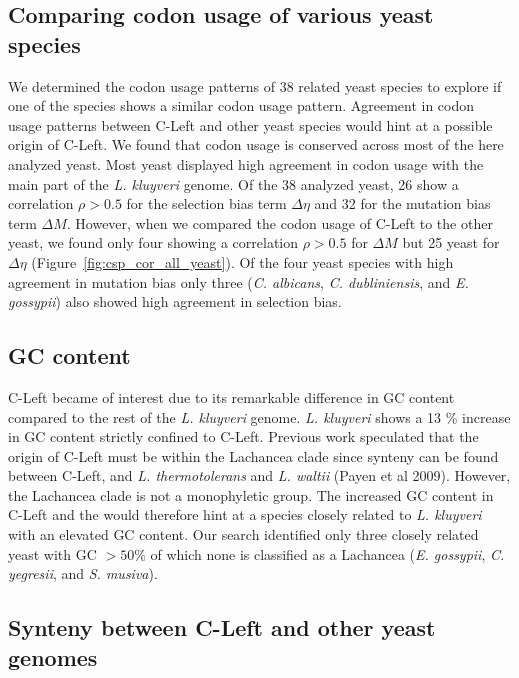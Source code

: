 \documentclass[12pt]{article}
\begin{document}
\subsection*{Comparing codon usage of various yeast species}
We determined the codon usage patterns of 38 related yeast species to explore if one of the species shows a similar codon usage pattern.
Agreement in codon usage patterns between C-Left and other yeast species would hint at a possible origin of C-Left.
We found that codon usage is conserved across most of the here analyzed yeast. 
Most yeast displayed high agreement in codon usage with the main part of the \textit{L. kluyveri} genome. Of the 38 analyzed yeast, 26 show a correlation $\rho > 0.5$ for the selection bias term $\Delta \eta$ and 32 for the mutation bias term $\Delta M$.
However, when we compared the codon usage of C-Left to the other yeast, we found only four showing a correlation $\rho > 0.5$ for $\Delta M$ but 25 yeast for $\Delta \eta$ (Figure~\ref{fig:csp_cor_all_yeast}).
Of the four yeast species with high agreement in mutation bias only three (\textit{C. albicans}, \textit{C. dubliniensis}, and \textit{E. gossypii}) also showed high agreement in selection bias.

\subsection*{GC content}
C-Left became of interest due to its remarkable difference in GC content compared to the rest of the \textit{L. kluyveri} genome.
\textit{L. kluyveri} shows a 13 \% increase in GC content strictly confined to C-Left. 
Previous work speculated that the origin of C-Left must be within the Lachancea clade since synteny can be found between C-Left, and \textit{L. thermotolerans} and \textit{L. waltii} (Payen et al 2009).
However, the Lachancea clade is not a monophyletic group.
The increased GC content in C-Left and the would therefore hint at a species closely related to \textit{L. kluyveri} with an elevated GC content. 
Our search identified only three closely related yeast with GC $> 50\%$ of which none is classified as a Lachancea (\textit{E. gossypii}, \textit{C. yegresii}, and \textit{S. musiva}).

\subsection*{Synteny between C-Left and other yeast genomes}
\end{document}
